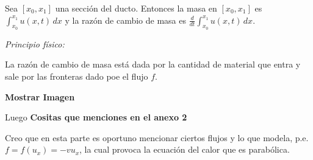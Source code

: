 Sea $[x_0, x_1]$ una sección del ducto. Entonces la masa en $[x_0, x_1]$ es $\int_{x_0}^{x_1} u(x,t) \,dx$ y la razón de cambio de masa es $\frac{d}{dt} \int_{x_0}^{x_1} u(x,t) \,dx$.

\textit{Principio físico:}

La razón de cambio de masa está dada por la cantidad de material que entra y sale por las fronteras dado poe el flujo $f$.

\textbf{Mostrar Imagen}

Luego
\textbf{Cositas que menciones en el anexo 2} 

Creo que en esta parte es oportuno mencionar ciertos flujos y lo que modela, p.e. $f=f(u_x) = -v u_x$, la cual provoca la ecuación del calor que es parabólica.




















